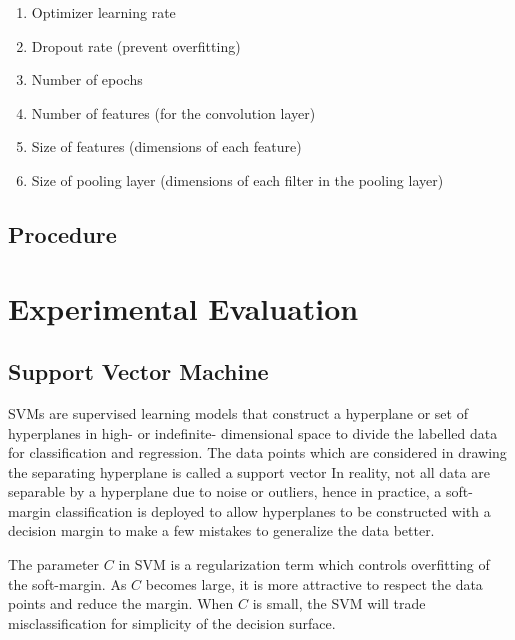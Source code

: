 \documentclass[letterpaper]{article}
\begin{document}
\begin{enumerate}

    \item Optimizer learning rate

    \item Dropout rate (prevent overfitting)

    \item Number of epochs

    \item Number of features (for the convolution layer)

    \item Size of features (dimensions of each feature)

    \item Size of pooling layer (dimensions of each filter in the pooling layer)

\end{enumerate}



\subsection{Procedure}

\section{Experimental Evaluation}

\subsection{Support Vector Machine}
SVMs are supervised learning models that construct a hyperplane or set of hyperplanes in high-
or indefinite- dimensional space to divide the labelled data for classification and regression.
The data points which are considered in drawing the separating hyperplane is called a support
vector In reality, not all data are separable by a hyperplane due to noise or outliers, hence in
practice, a soft-margin classification is deployed to allow hyperplanes to be constructed
with a decision margin to make a few mistakes to generalize the data better.

The parameter $\textit{C}$ in SVM is a regularization term which controls overfitting of the soft-margin.
As $\textit{C}$ becomes large, it is more attractive to respect the data points and reduce
the margin. When $\textit{C}$ is small, the SVM will trade misclassification for simplicity
of the decision surface.
\end{document}
